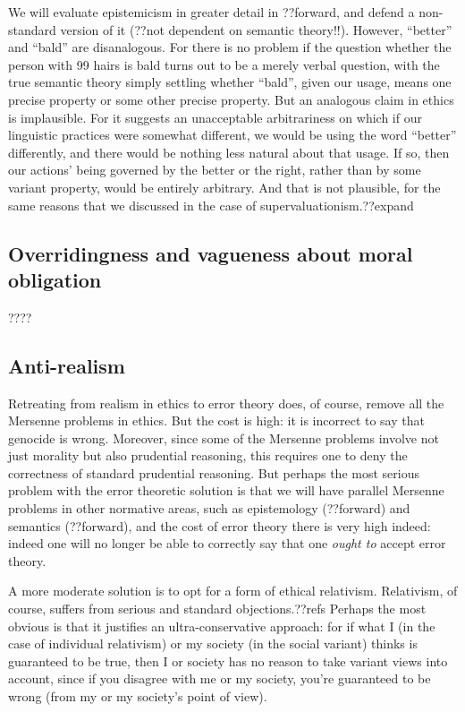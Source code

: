 We will evaluate epistemicism in greater detail in ??forward, and defend a non-standard version of it (??not dependent on semantic theory!!). However, ``better'' and ``bald'' are disanalogous. For there is no
problem if the question whether the person with 99 hairs is bald turns out to be a merely verbal question, with the true semantic theory simply settling whether
``bald'', given our usage, means one precise property or some other precise property. But an analogous claim in ethics is implausible. For it suggests an
unacceptable arbitrariness on which if our linguistic practices were somewhat different, we would be using the word ``better'' differently, and there would be
nothing less natural about that usage. If so, then our actions' being governed by the better or the right, rather than by some variant property, would be entirely arbitrary.
And that is not plausible, for the same reasons that we discussed in the case of supervaluationism.??expand

\subsection{Overridingness and vagueness about moral obligation}
????

\subsection{Anti-realism}
Retreating from realism in ethics to error theory does, of course, remove all the Mersenne problems in ethics. But the
cost is high: it is incorrect to say that genocide is wrong. Moreover, since some of the Mersenne problems involve not
just morality but also prudential reasoning, this requires one to deny the correctness of standard prudential reasoning.
But perhaps the most serious problem with the error theoretic solution is that we will have parallel Mersenne problems
in other normative areas, such as epistemology (??forward) and semantics (??forward), and the cost of error theory 
there is very high indeed: indeed one will no longer  be able to correctly say that one \textit{ought to} accept error theory.

A more moderate solution is to opt for a form of ethical relativism. Relativism, of course, suffers from serious and
standard objections.??refs Perhaps the most obvious is that it justifies an ultra-conservative approach: for if what
I (in the case of individual relativism) or my society (in the social variant) thinks is guaranteed to be true, then
I or society has no reason to take variant views into account, since if you disagree with me or my society, you're guaranteed to be 
wrong (from my or my society's point of view).


